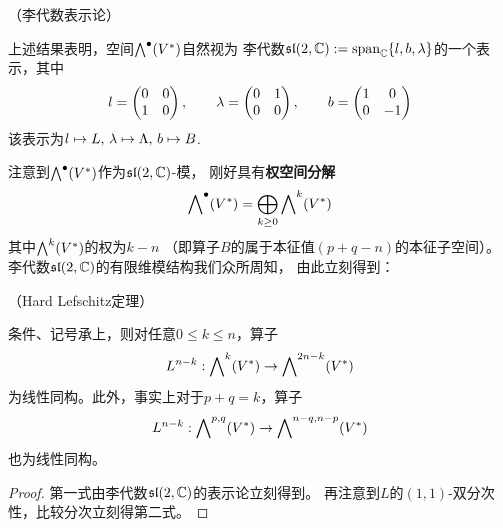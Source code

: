 \begin{rem}（李代数表示论）

上述结果表明，空间$\bigwedge\nolimits^{\bullet}(V^*)$自然视为
李代数$\mathfrak{sl}(2,\mathbb{C}):=\operatorname{span}_{\mathbb{C}}\{l,b,\lambda\}$的一个表示，其中
$$
  l=\begin{pmatrix}
      0 & 0\\
      1 & 0
    \end{pmatrix}
,\qquad
  \lambda=\begin{pmatrix}
      0 & 1\\
      0 & 0
    \end{pmatrix}
,\qquad
  b=\begin{pmatrix}
      1 & 0\\
      0 & -1
    \end{pmatrix}
$$
该表示为$l\mapsto L,\,\lambda\mapsto\Lambda,\,b\mapsto B$.
\end{rem}

注意到$\bigwedge\nolimits^{\bullet}(V^*)$作为$\mathfrak{sl}(2,\mathbb{C})$-模，
刚好具有\textbf{权空间分解}
$$
  \bigwedge\nolimits^{\bullet}(V^*)
=
  \bigoplus_{k\geq 0}
    \bigwedge\nolimits^{k}(V^*)
$$
其中$\bigwedge\nolimits^{k}(V^*)$的权为$k-n$
（即算子$B$的属于本征值$(p+q-n)$的本征子空间）。
李代数$\mathfrak{sl}(2,\mathbb{C})$的有限维模结构我们众所周知，
由此立刻得到：


\begin{thm}（Hard Lefschitz定理）
\label{HL-局部-thm}

条件、记号承上，则对任意$0\leq k\leq n$，算子
$$L^{n-k}:\bigwedge\nolimits^{k}(V^*)\to\bigwedge\nolimits^{2n-k}(V^*)$$
为线性同构。此外，事实上对于$p+q=k$，算子
$$L^{n-k}:\bigwedge\nolimits^{p,q}(V^*)\to\bigwedge\nolimits^{n-q,n-p}(V^*)$$
也为线性同构。
\end{thm}

\begin{proof}
第一式由李代数$\mathfrak{sl}(2,\mathbb{C})$的表示论立刻得到。
再注意到$L$的$(1,1)$-双分次性，比较分次立刻得第二式。
\end{proof}



